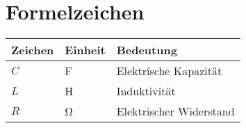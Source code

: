 \section*{Formelzeichen}
\setlength{\ltfix}{\dimexpr\textwidth-6\tabcolsep\relax}
\begin{longtable}{p{0.2\ltfix}p{0.15\ltfix}p{0.65\ltfix}}
    \toprule
    \textbf{Zeichen}  & \textbf{Einheit}  & \textbf{Bedeutung}\\
    \midrule \endhead%
    \midrule \endfoot%
    \bottomrule \endlastfoot%
    \(C\)                   & \si{\farad}       & Elektrische Kapazität\\
    \(L\)                   & \si{\henry}       & Induktivität\\
    \(R\)                   & \si{\ohm}         & Elektrischer Widerstand\\
\end{longtable}


%
\addtocounter{table}{-3}
